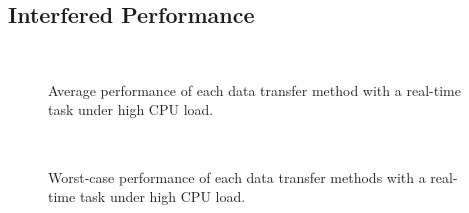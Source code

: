 \subsection{Interfered Performance}
\label{sec:interfered_performance}

\begin{figure}[!t]
 \begin{center}
  \\
  \caption{Average performance of each data transfer method with a
  real-time task under high CPU load.}
  \label{fig:average_realtime_cpuload}
 \end{center}
 \vspace{0.5em}
 \begin{center}
  \\
  \caption{Worst-case performance of each data transfer methods with a
  real-time task under high CPU load.}
  \label{fig:worst_realtime_cpuload}
  \end{center}
\end{figure}

